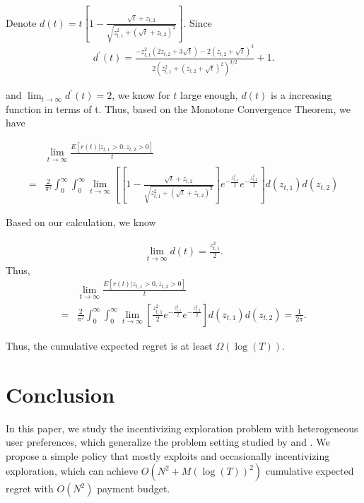 \documentclass{article}
\begin{document}
Denote $d(t)=t\left[1-\frac{\sqrt{t}+z_{t,2}}{\sqrt{z_{t,1}^2+(\sqrt{t}+z_{t,2})^2}}\right]$.
Since
\begin{align}
d^{'}(t)=\frac{-z_{t,1}^2(2z_{t,2}+3\sqrt{t})-2(z_{t,2}+\sqrt{t})^3}{2(z_{t,1}^2+(z_{t,2}+\sqrt{t})^2)^{3/2}}+1. \nonumber
\end{align}

and $\lim_{t\rightarrow \infty}d^{'}(t)=2$, we know for $t$ large enough, $d(t)$ is a increasing function in terms of t. Thus, based on the Monotone Convergence Theorem, we have

\begin{align}
&\lim_{t\rightarrow \infty}\frac{E[r(t)| z_{t,1}>0, z_{t,2}>0]}{t} \nonumber \\
=& \frac{2}{\pi^2}\int_{0}^{\infty} \int_{0}^{\infty}\lim_{t\rightarrow \infty}\left[ \left[1-\frac{\sqrt{t}+z_{t,2}}{\sqrt{z_{t,1}^2+(\sqrt{t}+z_{t,2})^2}}\right]e^{-\frac{z_{t,1}^2}{2}}e^{-\frac{z_{t,2}^2}{2}}\right]d(z_{t,1})d(z_{t,2}) \nonumber  
\end{align}

Based on our calculation, we know

\begin{align}
\lim_{t\rightarrow \infty} d(t)=\frac{z_{t,1}^2}{2}. \nonumber
\end{align}
Thus,
\begin{align}
&\lim_{t\rightarrow \infty}\frac{E[r(t)| z_{t,1}>0, z_{t,2}>0]}{t} \nonumber \\
=&\frac{2}{\pi^2}\int_{0}^{\infty} \int_{0}^{\infty}\lim_{t\rightarrow \infty}\left[ \frac{z_{t,1}^2}{2}e^{-\frac{z_{t,1}^2}{2}}e^{-\frac{z_{t,2}^2}{2}}\right]d(z_{t,1})d(z_{t,2}) = \frac{1}{2\pi}. \nonumber
\end{align}


Thus, the cumulative expected regret is at least $\Omega(\log(T))$.


\section{Conclusion}
In this paper, we study the incentivizing exploration problem with heterogeneous user preferences, which generalize the problem setting studied by \citet{frazier2014incentivizing} and \citet{han2015incentivizing}. We propose a simple policy that mostly exploits and occasionally incentivizing exploration, which can achieve $O(N^2+M(\log(T))^2)$ cumulative expected regret with $O(N^2)$ payment budget.

{}

\end{document}
